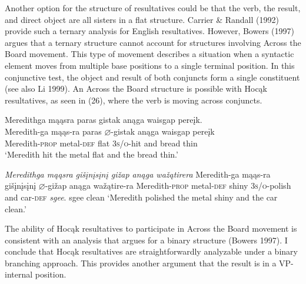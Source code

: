 \documentclass[output=paper]{LSP/langsci}
\begin{document}
Another option for the structure of resultatives could be that the verb, the result, and direct object are all sisters in a flat structure. Carrier \& Randall (1992) provide such a ternary analysis for English resultatives. However, Bowers (1997) argues that a ternary structure cannot account for structures involving Across the Board movement. This type of movement describes a situation when a syntactic element moves from multiple base positions to a single terminal position. In this conjunctive test, the object and result of both conjuncts form a single constituent (see also Li 1999). An Across the Board structure is possible with Hocąk resultatives, as seen in (26), where the verb is moving across conjuncts.

\begin{exe}
\ex
\begin{xlist}

\ex \glll Meredithga mąąsra paras gistak anąga waisgap pereįk. \\
Meredith-ga mąąs-ra paras {$\varnothing$}-gistak anąga waisgap pereįk\\
Meredith-\textsc{prop} metal-\textsc{def} flat \textsc{3s/o}-hit and bread thin\\
\glt `Meredith hit the metal flat and the bread thin.'

\ex \textit{Meredithga \hspace{1.58em} mąąsra \hspace{.9em} gišįnį{s}įnį \hspace{.1em}gižap  \hspace {2.4em} anąga wažątirera}  \newline Meredith-ga \hspace{1.18em} mąąs-ra \hspace {.5em} gišįnį{s}įnį {$\varnothing$}-gižap \hspace{1.3em} anąga wažątire-ra \newline Meredith-\textsc{prop} metal-\textsc{def} shiny \hspace{1.6em} \textsc{3s/o}-polish and \hspace{1em} car-\textsc{def} \newline\textit{sgee}. \newline
sgee \newline
clean \newline
`Meredith polished the metal shiny and the car clean.'

\end{xlist}
\end{exe}
 
The ability of Hocąk resultatives to participate in Across the Board movement is consistent with an analysis that argues for a binary structure (Bowers 1997). I conclude that Hocąk resultatives are straightforwardly analyzable under a binary branching approach. This provides another argument that the result is in a VP-internal position.
 
\end{document}

